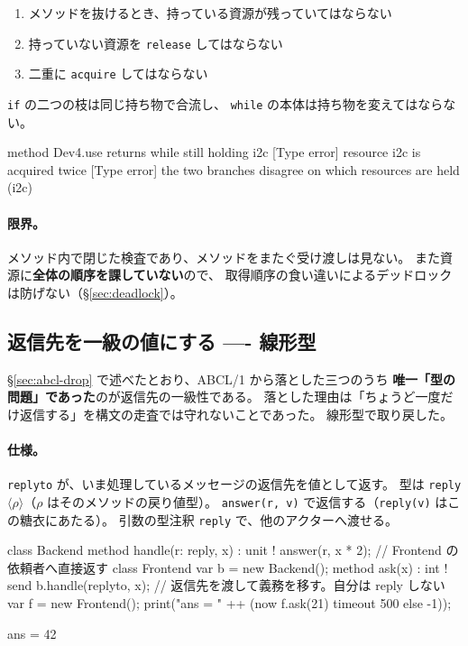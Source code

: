 \documentclass[11pt,a4paper]{ltjsarticle}
\theoremstyle{definition}
\theoremstyle{remark}
\begin{document}
\begin{enumerate}
\item メソッドを抜けるとき、持っている資源が残っていてはならない
\item 持っていない資源を \texttt{release} してはならない
\item 二重に \texttt{acquire} してはならない
\end{enumerate}

\texttt{if} の二つの枝は同じ持ち物で合流し、
\texttt{while} の本体は持ち物を変えてはならない。

\begin{term}
 method Dev4.use returns while still holding i2c
[Type error] resource i2c is acquired twice
[Type error] the two branches disagree on which resources are held (i2c)
\end{term}

\paragraph{限界。}
メソッド内で閉じた検査であり、メソッドをまたぐ受け渡しは見ない。
また資源に\textbf{全体の順序を課していない}ので、
取得順序の食い違いによるデッドロックは防げない（\S\ref{sec:deadlock}）。

\subsection{返信先を一級の値にする ---- 線形型}
\label{sec:reply1st}

\S\ref{sec:abcl-drop} で述べたとおり、ABCL/1 から落とした三つのうち
\textbf{唯一「型の問題」であった}のが返信先の一級性である。
落とした理由は「ちょうど一度だけ返信する」を構文の走査では守れないことであった。
線形型で取り戻した。

\paragraph{仕様。}
\texttt{replyto} が、いま処理しているメッセージの返信先を値として返す。
型は \texttt{reply}$\langle\rho\rangle$（$\rho$ はそのメソッドの戻り値型）。
\texttt{answer(r, v)} で返信する（\texttt{reply(v)} はこの糖衣にあたる）。
引数の型注釈 \texttt{reply} で、他のアクターへ渡せる。

\begin{aipl}
class Backend {
  method handle(r: reply, x) : unit !{} {
    answer(r, x * 2);            // Frontend の依頼者へ直接返す
  }
}
class Frontend {
  var b = new Backend();
  method ask(x) : int !{} {
    send b.handle(replyto, x);   // 返信先を渡して義務を移す。自分は reply しない
  }
}
var f = new Frontend();
print("ans = " ++ (now f.ask(21) timeout 500 else -1));
\end{aipl}
\begin{term}
ans = 42
\end{term}
\end{document}
